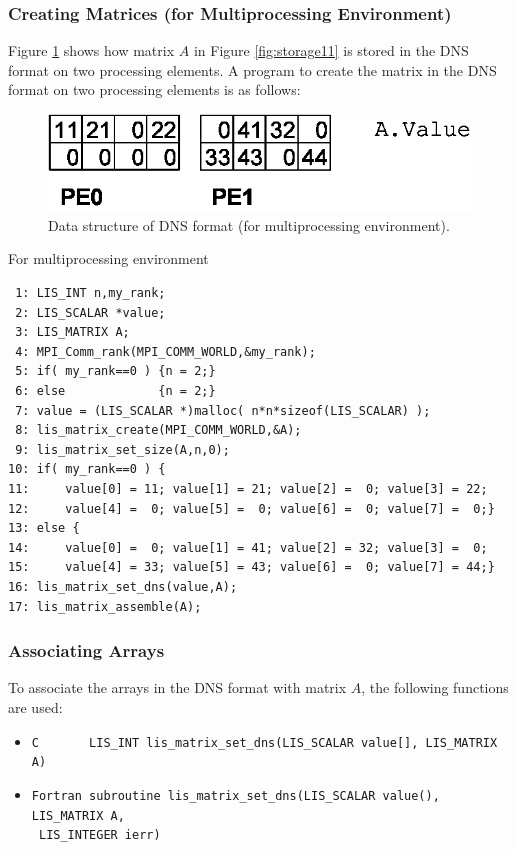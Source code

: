 \documentclass[a4paper]{article}
\begin{document}
\newpage
\subsubsection{Creating Matrices (for Multiprocessing Environment)}
Figure \ref{fig:storage11_mpi} shows how matrix $A$ in Figure
\ref{fig:storage11} is stored in the DNS format on two
processing elements. A program to create the matrix in the DNS format on
two processing elements is as follows:
\begin{figure}[h]
{\centering 
\includegraphics{storage11_mpi.eps} 
\caption{Data structure of DNS format (for multiprocessing environment).}\label{fig:storage11_mpi}}
\end{figure}
\begin{itemsquarebox}[l]{For multiprocessing environment}
\small
\begin{verbatim}
 1: LIS_INT n,my_rank;
 2: LIS_SCALAR *value;
 3: LIS_MATRIX A;
 4: MPI_Comm_rank(MPI_COMM_WORLD,&my_rank);
 5: if( my_rank==0 ) {n = 2;}
 6: else             {n = 2;}
 7: value = (LIS_SCALAR *)malloc( n*n*sizeof(LIS_SCALAR) );
 8: lis_matrix_create(MPI_COMM_WORLD,&A);
 9: lis_matrix_set_size(A,n,0);
10: if( my_rank==0 ) {
11:     value[0] = 11; value[1] = 21; value[2] =  0; value[3] = 22;
12:     value[4] =  0; value[5] =  0; value[6] =  0; value[7] =  0;}
13: else {
14:     value[0] =  0; value[1] = 41; value[2] = 32; value[3] =  0;
15:     value[4] = 33; value[5] = 43; value[6] =  0; value[7] = 44;}
16: lis_matrix_set_dns(value,A);
17: lis_matrix_assemble(A);
\end{verbatim}
\end{itemsquarebox}

\subsubsection{Associating Arrays}
To associate the arrays in the DNS format with matrix $A$, the following functions are used:
\begin{itemize}
\item \verb|C       LIS_INT lis_matrix_set_dns(LIS_SCALAR value[], LIS_MATRIX A)|
\item \verb|Fortran subroutine lis_matrix_set_dns(LIS_SCALAR value(), LIS_MATRIX A,|\\
      \verb| LIS_INTEGER ierr)|
\end{itemize}
\end{document}
